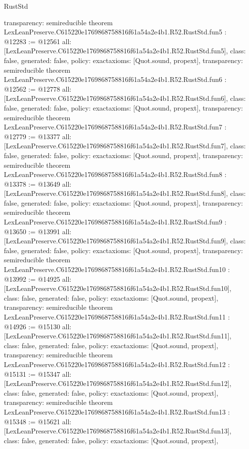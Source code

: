 \begin{lexlean}{RustStd}
\begin{coremodule}
{  transparency: semireducible
}
theorem LexLeanPreserve.C615220e1769868758816f61a54a2e4b1.R52.RustStd.fun5 : @12283 := @12561 {
  all: [LexLeanPreserve.C615220e1769868758816f61a54a2e4b1.R52.RustStd.fun5],
  class: false,
  generated: false,
  policy: exact{axioms: [Quot.sound, propext]},
  transparency: semireducible
}
theorem LexLeanPreserve.C615220e1769868758816f61a54a2e4b1.R52.RustStd.fun6 : @12562 := @12778 {
  all: [LexLeanPreserve.C615220e1769868758816f61a54a2e4b1.R52.RustStd.fun6],
  class: false,
  generated: false,
  policy: exact{axioms: [Quot.sound, propext]},
  transparency: semireducible
}
theorem LexLeanPreserve.C615220e1769868758816f61a54a2e4b1.R52.RustStd.fun7 : @12779 := @13377 {
  all: [LexLeanPreserve.C615220e1769868758816f61a54a2e4b1.R52.RustStd.fun7],
  class: false,
  generated: false,
  policy: exact{axioms: [Quot.sound, propext]},
  transparency: semireducible
}
theorem LexLeanPreserve.C615220e1769868758816f61a54a2e4b1.R52.RustStd.fun8 : @13378 := @13649 {
  all: [LexLeanPreserve.C615220e1769868758816f61a54a2e4b1.R52.RustStd.fun8],
  class: false,
  generated: false,
  policy: exact{axioms: [Quot.sound, propext]},
  transparency: semireducible
}
theorem LexLeanPreserve.C615220e1769868758816f61a54a2e4b1.R52.RustStd.fun9 : @13650 := @13991 {
  all: [LexLeanPreserve.C615220e1769868758816f61a54a2e4b1.R52.RustStd.fun9],
  class: false,
  generated: false,
  policy: exact{axioms: [Quot.sound, propext]},
  transparency: semireducible
}
theorem LexLeanPreserve.C615220e1769868758816f61a54a2e4b1.R52.RustStd.fun10 : @13992 := @14925 {
  all: [LexLeanPreserve.C615220e1769868758816f61a54a2e4b1.R52.RustStd.fun10],
  class: false,
  generated: false,
  policy: exact{axioms: [Quot.sound, propext]},
  transparency: semireducible
}
theorem LexLeanPreserve.C615220e1769868758816f61a54a2e4b1.R52.RustStd.fun11 : @14926 := @15130 {
  all: [LexLeanPreserve.C615220e1769868758816f61a54a2e4b1.R52.RustStd.fun11],
  class: false,
  generated: false,
  policy: exact{axioms: [Quot.sound, propext]},
  transparency: semireducible
}
theorem LexLeanPreserve.C615220e1769868758816f61a54a2e4b1.R52.RustStd.fun12 : @15131 := @15347 {
  all: [LexLeanPreserve.C615220e1769868758816f61a54a2e4b1.R52.RustStd.fun12],
  class: false,
  generated: false,
  policy: exact{axioms: [Quot.sound, propext]},
  transparency: semireducible
}
theorem LexLeanPreserve.C615220e1769868758816f61a54a2e4b1.R52.RustStd.fun13 : @15348 := @15621 {
  all: [LexLeanPreserve.C615220e1769868758816f61a54a2e4b1.R52.RustStd.fun13],
  class: false,
  generated: false,
  policy: exact{axioms: [Quot.sound, propext]},
}
\end{coremodule}
\end{lexlean}
